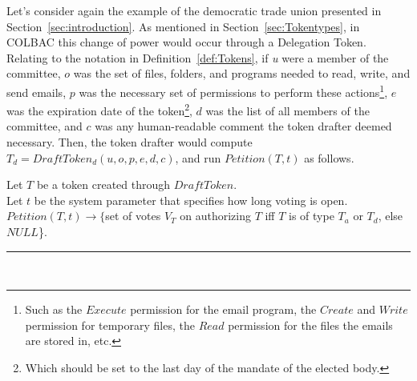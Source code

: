 Let's consider again the example of the democratic trade union presented in
Section~\ref{sec:introduction}. As mentioned in Section~\ref{sec:Tokentypes},
in COLBAC this change of power would occur through a Delegation Token. Relating
to the notation in Definition~\ref{def:Tokens}, if \textit{u} were a member of
the committee, $o$ was the set of files, folders, and programs needed to read,
write, and send emails, $p$ was the necessary set of permissions to perform
these actions\footnote{Such as the $Execute$ permission for the email program,
the $Create$ and $Write$ permission for temporary files, the $Read$ permission
for the files the emails are stored in, etc.}, $e$ was the expiration date of
the token\footnote{Which should be set to the last day of the mandate of the
elected body.}, $d$ was the list of all members of the committee, and $c$ was
any human-readable comment the token drafter deemed necessary. Then, the token
drafter would compute $T_{d} = DraftToken_{d}(u,o,p,e,d,c)$, and run
$Petition(T, t)$ as follows.

\begin{definition}\label{def:petition}
Let $T$ be a token created through $DraftToken$.\\
Let $t$ be the system parameter that specifies how long voting is open.\\
$Petition(T, t) \rightarrow \{$set of votes $V_{T}$ on authorizing $T$ iff $T$ is
of type $T_{a}$ or $T_{d}$, else $NULL$\}.\\
\hrule \mbox{}\\
\end{definition}

